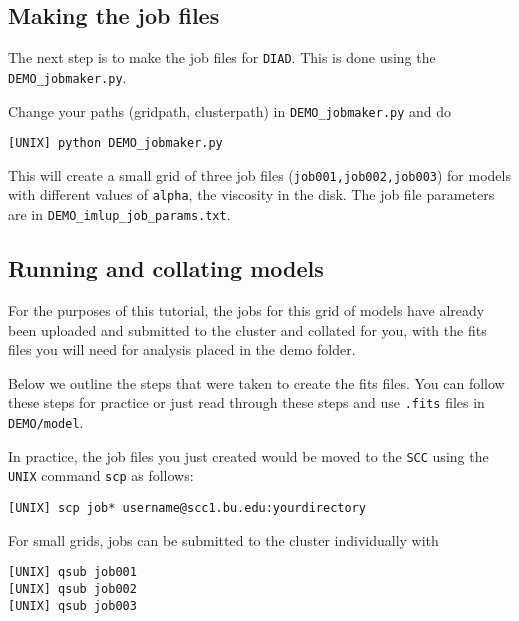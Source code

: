 \documentclass{article}
\begin{document}
\subsection{Making the job files}

The next step is to make the job files for \texttt{DIAD}. This is done using the \texttt{DEMO\_jobmaker.py}. 

Change your paths (gridpath, clusterpath) in \texttt{DEMO\_jobmaker.py} and do

\vspace{2mm}
\texttt{[UNIX] python DEMO\_jobmaker.py}
\vspace{2mm}

\noindent This will create a small grid of three job files (\texttt{job001,job002,job003}) for models with different values of \texttt{alpha}, the viscosity in the disk.  The job file parameters are in \texttt{DEMO\_imlup\_job\_params.txt}.

\subsection{Running and collating models}\label{running}

\noindent For the purposes of this tutorial, the jobs for this grid of models have already been uploaded and submitted to the cluster and collated for you, with the fits files you will need for analysis placed in the demo folder. 
\vspace{2mm}

\noindent Below we outline the steps that were taken to create the fits files.  You can follow these steps for practice or just read through these steps and use \texttt{.fits} files in \texttt{DEMO/model}.
\vspace{2mm}

\noindent In practice, the job files you just created would be moved to the \texttt{SCC} using the \texttt{UNIX} command \texttt{scp} as follows: 

\vspace{2mm}
\texttt{[UNIX] scp job* username@scc1.bu.edu:yourdirectory}
\vspace{2mm}

For small grids, jobs can be submitted to the cluster individually with

\vspace{2mm}
\texttt{[UNIX] qsub job001} \\
\texttt{[UNIX] qsub job002} \\
\texttt{[UNIX] qsub job003} \\
\vspace{2mm}
\end{document}
